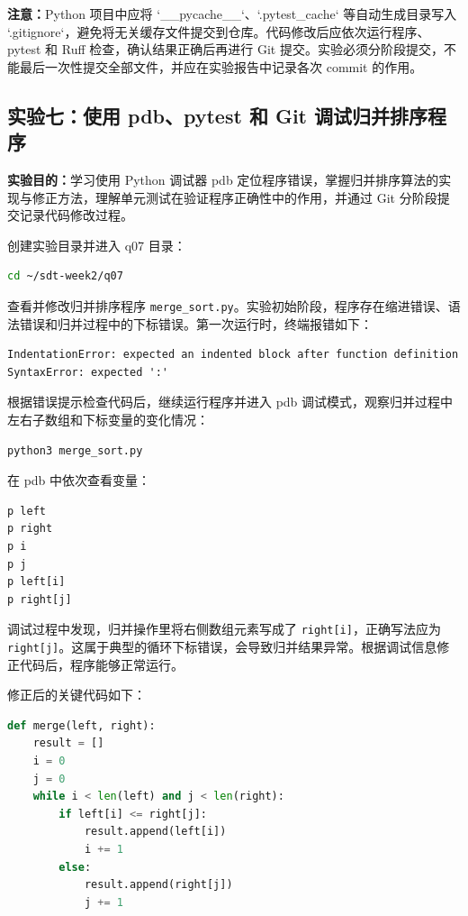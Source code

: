 \documentclass[UTF8,12pt,a4paper]{ctexart}
\begin{document}
\textbf{注意：}Python 项目中应将 `\_\_pycache\_\_`、`.pytest\_cache` 等自动生成目录写入 `.gitignore`，避免将无关缓存文件提交到仓库。代码修改后应依次运行程序、pytest 和 Ruff 检查，确认结果正确后再进行 Git 提交。实验必须分阶段提交，不能最后一次性提交全部文件，并应在实验报告中记录各次 commit 的作用。


\subsection{实验七：使用 pdb、pytest 和 Git 调试归并排序程序}

\textbf{实验目的：}学习使用 Python 调试器 pdb 定位程序错误，掌握归并排序算法的实现与修正方法，理解单元测试在验证程序正确性中的作用，并通过 Git 分阶段提交记录代码修改过程。

创建实验目录并进入 q07 目录：

\begin{lstlisting}[language=bash]
cd ~/sdt-week2/q07
\end{lstlisting}

查看并修改归并排序程序 \texttt{merge\_sort.py}。实验初始阶段，程序存在缩进错误、语法错误和归并过程中的下标错误。第一次运行时，终端报错如下：

\begin{lstlisting}
IndentationError: expected an indented block after function definition
SyntaxError: expected ':'
\end{lstlisting}

根据错误提示检查代码后，继续运行程序并进入 pdb 调试模式，观察归并过程中左右子数组和下标变量的变化情况：

\begin{lstlisting}[language=bash]
python3 merge_sort.py
\end{lstlisting}

在 pdb 中依次查看变量：

\begin{lstlisting}
p left
p right
p i
p j
p left[i]
p right[j]
\end{lstlisting}

调试过程中发现，归并操作里将右侧数组元素写成了 \texttt{right[i]}，正确写法应为 \texttt{right[j]}。这属于典型的循环下标错误，会导致归并结果异常。根据调试信息修正代码后，程序能够正常运行。

修正后的关键代码如下：

\begin{lstlisting}[language=python]
def merge(left, right):
    result = []
    i = 0
    j = 0
    while i < len(left) and j < len(right):
        if left[i] <= right[j]:
            result.append(left[i])
            i += 1
        else:
            result.append(right[j])
            j += 1
\end{lstlisting}
\end{document}
